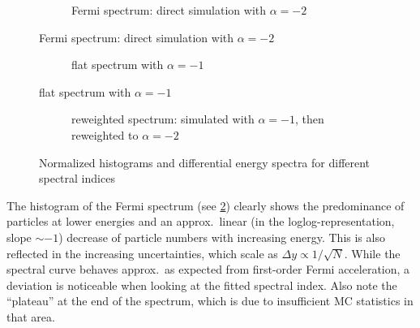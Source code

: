 
\begin{figure}[b!]
    \centering
    \begin{subfigure}[t]{.5\textwidth}
        \centering
        \caption{Fermi spectrum: direct simulation with $\alpha=-2$}
        \label{fig:rew-fermi}
    \end{subfigure}
\end{figure}
\begin{figure}[b!]
    \ContinuedFloat
    \centering
    \begin{subfigure}[t]{.5\textwidth}
        \centering
        \caption{flat spectrum with $\alpha=-1$}
        \label{fig:rew-flat}
    \end{subfigure}
\end{figure}
\begin{figure}[t!]
    \ContinuedFloat
    \centering
    \begin{subfigure}[t]{.5\textwidth}
        \centering
        \caption{reweighted spectrum: simulated with $\alpha=-1$, then
            reweighted to $\alpha=-2$}
        \label{fig:rew-rew}
    \end{subfigure}

    \caption{Normalized histograms and differential energy spectra for
    different spectral indices}
    \label{fig:rew}
\end{figure}

The histogram of the Fermi spectrum (see \cref{fig:rew-fermi}) clearly shows
the predominance of particles at lower energies and an approx.~linear (in
the loglog-representation, slope $\sim-1$) decrease of particle numbers with
increasing energy. This is also reflected in the increasing uncertainties,
which scale as $\Delta{y}\propto1/\sqrt{N}$.
While the spectral curve behaves approx.~as expected from first-order Fermi
acceleration, a deviation is noticeable when looking at the fitted spectral
index.
Also note the \enquote{plateau} at the end of the spectrum, which is due to
insufficient MC statistics in that area.

